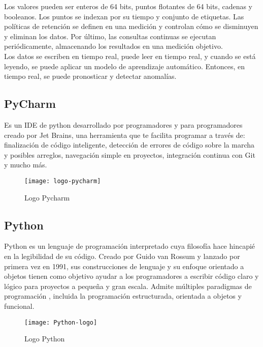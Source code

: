\documentclass[ spanish, a4paper, 12pt, oneside]{report}
\begin{document}
Los valores pueden ser enteros de 64 bits, puntos flotantes de 64 bits, cadenas y booleanos. Los puntos se indexan por su tiempo y conjunto de etiquetas. Las políticas de retención se definen en una medición y controlan cómo se 
disminuyen y eliminan los datos. Por último, las consultas continuas se ejecutan periódicamente, almacenando los resultados en una medición objetivo. \\

Los datos se escriben en tiempo real, puede leer en tiempo real, y cuando se está leyendo, se puede aplicar un modelo de aprendizaje automático. 
Entonces, en tiempo real, se puede pronosticar y detectar anomalías. \\


\subsection{PyCharm}
Es un IDE de python desarrollado por programadores y para programadores creado por Jet Brains, una herramienta que te facilita programar a través de: finalización de código inteligente, detección de errores de código sobre la marcha y posibles arreglos, navegación simple en proyectos, 
integración continua con Git y mucho más. \\

\begin{figure}[!h]
   \centering
   \texttt{[image: logo-pycharm]}\\
      \caption{\label{fig: Logo Pycharm} Logo Pycharm}
\end{figure}

\subsection{Python}
Python es un lenguaje de programación interpretado cuya filosofía hace hincapié en la legibilidad de su código. Creado por Guido van Rossum y lanzado por primera vez en 1991, sus construcciones de lenguaje y su enfoque orientado a objetos tienen como objetivo ayudar a los 
programadores a escribir código claro y lógico para proyectos a pequeña y gran escala. Admite múltiples paradigmas de programación , incluida la programación estructurada, orientada a objetos y funcional. \\

\begin{figure}[!h]
   \centering
   \texttt{[image: Python-logo]}\\
      \caption{\label{fig: Logo Python} Logo Python}
\end{figure}
\end{document}
